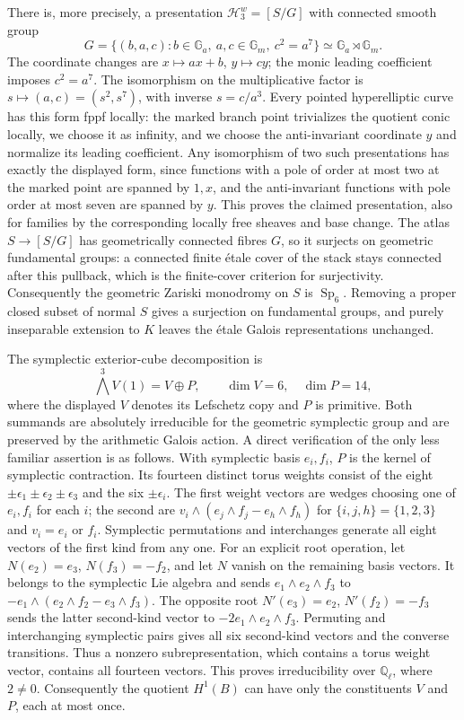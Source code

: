 There is, more precisely, a presentation
$\mathcal H_3^w=[S/G]$ with connected smooth group
\[
 G=\{(b,a,c):b\in\mathbb G_a,\ a,c\in\mathbb G_m,
                    \ c^2=a^7\}
       \simeq\mathbb G_a\rtimes\mathbb G_m.
\]
The coordinate changes are $x\mapsto ax+b$, $y\mapsto cy$;
the monic leading coefficient imposes $c^2=a^7$.
The isomorphism on the multiplicative factor is
$s\mapsto(a,c)=(s^2,s^7)$, with inverse $s=c/a^3$.
Every pointed hyperelliptic curve has this form fppf locally:
the marked branch point trivializes the quotient conic locally,
we choose it as infinity, and we choose the anti-invariant
coordinate $y$ and normalize its leading coefficient.  Any
isomorphism of two such presentations has exactly the displayed
form, since functions with a pole of order at most two at the
marked point are spanned by $1,x$, and the anti-invariant
functions with pole order at most seven are spanned by $y$.
This proves the claimed presentation, also for families by the
corresponding locally free sheaves and base change.
The atlas $S\to[S/G]$ has geometrically connected fibres $G$,
so it surjects on geometric fundamental groups: a connected
finite étale cover of the stack stays connected after this
pullback, which is the finite-cover criterion for surjectivity.
Consequently the geometric Zariski monodromy on $S$ is
$\operatorname{Sp}_6$.  Removing a proper closed subset of
normal $S$ gives a surjection on fundamental groups, and
purely inseparable extension to $K$ leaves the étale Galois
representations unchanged.

The symplectic exterior-cube decomposition is
\[
 \bigwedge^3V(1)=V\oplus P,
 \qquad \dim V=6,\quad \dim P=14,
\]
where the displayed $V$ denotes its Lefschetz copy and $P$ is
primitive.  Both summands are absolutely irreducible for the
geometric symplectic group and are preserved by the arithmetic
Galois action.  A direct verification of the only less familiar
assertion is as follows.  With symplectic basis $e_i,f_i$, $P$
is the kernel of symplectic contraction.  Its fourteen distinct
torus weights consist of the eight $\pm\epsilon_1\pm\epsilon_2
\pm\epsilon_3$ and the six $\pm\epsilon_i$.  The first weight
vectors are wedges choosing one of $e_i,f_i$ for each $i$; the
second are $v_i\wedge(e_j\wedge f_j-e_h\wedge f_h)$ for
$\{i,j,h\}=\{1,2,3\}$ and $v_i=e_i$ or $f_i$.
Symplectic permutations and interchanges generate all eight
vectors of the first kind from any one.  For an explicit root operation, let $N(e_2)=e_3$,
$N(f_3)=-f_2$, and let $N$ vanish on the remaining basis
vectors.  It belongs to the symplectic Lie algebra and sends
$e_1\wedge e_2\wedge f_3$ to
$-e_1\wedge(e_2\wedge f_2-e_3\wedge f_3)$.
The opposite root $N'(e_3)=e_2$, $N'(f_2)=-f_3$ sends the
latter second-kind vector to $-2e_1\wedge e_2\wedge f_3$.
Permuting and interchanging symplectic pairs gives all six
second-kind vectors and the converse transitions.  Thus a nonzero
subrepresentation, which contains a torus weight vector, contains
all fourteen vectors.  This proves irreducibility over
$\mathbb Q_\ell$, where $2\ne0$.
Consequently the quotient $H^1(B)$ can have only the constituents
$V$ and $P$, each at most once.

